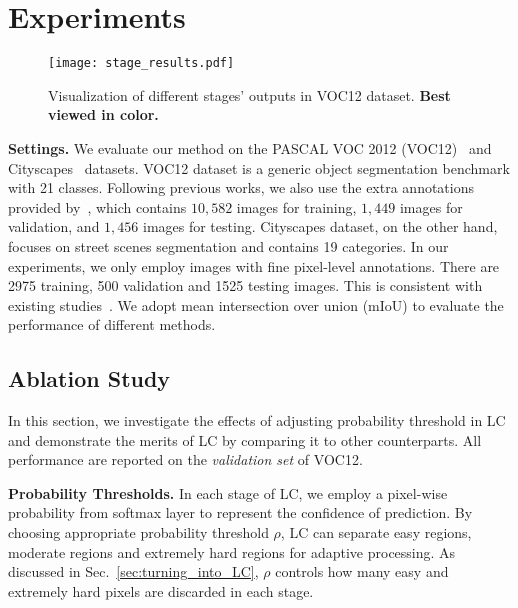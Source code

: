 \documentclass[10pt,twocolumn,letterpaper]{article}
\begin{document}
\section{Experiments}
\label{sec:experiments}


\begin{figure}
    \centering
    \texttt{[image: stage\_results.pdf]}
    \caption{\small{Visualization of different stages' outputs in VOC12 dataset. \textbf{Best viewed in color.}}}
    \label{fig:stage_results}
    \vspace{-12pt}
\end{figure}

\noindent
\textbf{Settings.} 
We evaluate our method on the PASCAL VOC 2012 (VOC12)~\cite{everingham2010pascal} and Cityscapes~\cite{Cordts2016Cityscapes} datasets.
VOC12 dataset is a generic object segmentation benchmark with 21 classes.
Following previous works, we also use the extra annotations provided by~\cite{hariharan2011semantic}, which contains $10,582$ images for training, $1,449$ images for validation, and $1,456$ images for testing. 
Cityscapes dataset, on the other hand, focuses on street scenes segmentation and contains 19 categories.
In our experiments, we only employ images with fine pixel-level annotations. There are 2975 training, 500 validation and 1525 testing images. This is consistent with existing studies~\cite{lin2015efficient, CP2016Deeplab}.
We adopt mean intersection over union (mIoU) to evaluate the performance of different methods. 

\subsection{Ablation Study}
\label{sec:effectiveness}




In this section, we investigate the effects of adjusting probability threshold in LC and demonstrate the merits of LC by comparing it to other counterparts.
All performance are reported on the \emph{validation set} of VOC12.

\noindent
\textbf{Probability Thresholds.}
In each stage of LC, we employ a pixel-wise probability from softmax layer to represent the confidence of prediction.
By choosing appropriate probability threshold $\rho$, LC can separate easy regions, moderate regions and extremely hard regions for adaptive processing.
As discussed in Sec.~\ref{sec:turning_into_LC}, $\rho$ controls how many easy and extremely hard pixels are discarded in each stage.
\end{document}
